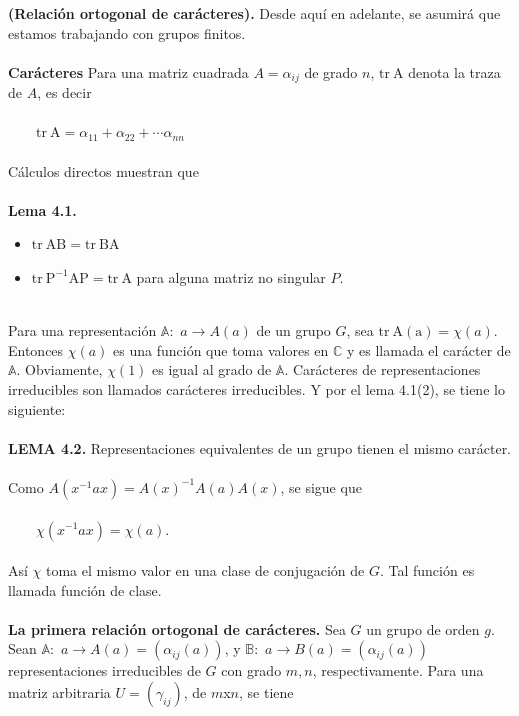 \documentclass[12pt]{book}
\theoremstyle{definition}
\newcounter{in}
\newcounter{ini}
\begin{document}
\textbf{(Relación ortogonal de carácteres).} Desde aquí en adelante, se asumirá que estamos trabajando con grupos finitos.\\~\\
\textbf{Carácteres} Para una matriz cuadrada $A=\alpha_{ij}$ de grado $n$, $\mathrm{tr\ A}$ denota la traza de $A$, es decir\\~\\
$\qquad \mathrm{tr\ A}=\alpha_{11}+\alpha_{22}+ \cdots \alpha_{nn}$\\~\\
Cálculos directos muestran que\\~\\
\textbf{Lema 4.1. }
\begin{itemize}
\item $\mathrm{tr\ AB}=\mathrm{tr\ BA}$
\item $\mathrm{tr\ P^{-1}AP}=\mathrm{tr\ A}$ para alguna matriz no singular $P$.\\~\\
\end{itemize}
Para una representación $\mathbb{A}:$ $a\rightarrow A\left(a\right)$ de un grupo $G$, sea $\mathrm{tr\ A(a)}=\chi(a)$. Entonces $\chi(a)$ es una función que toma valores en $\mathbb{C}$  y es llamada el carácter de $\mathbb{A}$. Obviamente, $\chi(1)$ es igual al grado de $\mathbb{A}$. Carácteres de representaciones irreducibles son llamados carácteres irreducibles. Y por el lema 4.1(2), se tiene lo siguiente:\\~\\
\textbf{LEMA 4.2. } Representaciones equivalentes de un grupo tienen el mismo carácter.\\~\\
Como $A(x^{-1}ax)=A(x)^{-1}A(a)A(x)$, se sigue que\\~\\
$\qquad \chi(x^{-1}ax)=\chi(a)$.\\~\\
Así $\chi$ toma el mismo valor en una clase de conjugación de $G$. Tal función es llamada función de clase.\\~\\
\textbf{La primera relación ortogonal de carácteres.} Sea $G$ un grupo de orden $g$. Sean $\mathbb{A}:$ $a\rightarrow A\left(a\right) = (\alpha_{ij}(a))$, y $\mathbb{B}:$ $a\rightarrow B\left(a\right) = (\alpha_{ij}(a))$ representaciones irreducibles de $G$ con grado $m,n$, respectivamente. Para una matriz arbitraria $U=(\gamma_{ij})$, de $m$x$n$, se tiene\\
\end{document}
